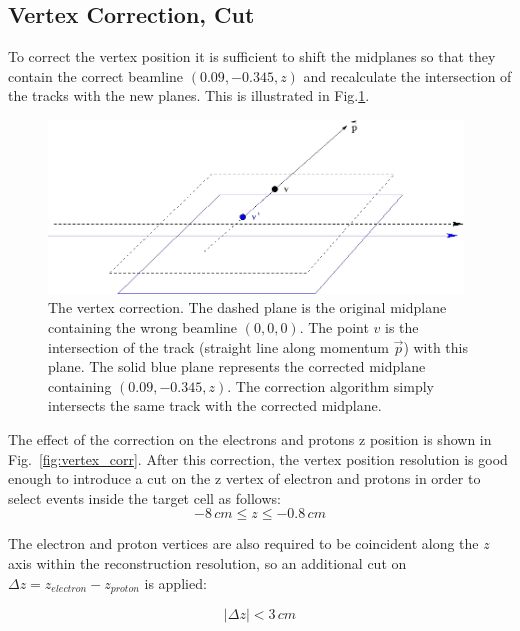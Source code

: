 \clearpage\newpage

\subsection{Vertex Correction, Cut}
To correct the vertex position it is sufficient to shift the midplanes
so that they contain the correct beamline $(0.09, -0.345, z)$ and recalculate 
the intersection of the tracks with the new planes.
This is illustrated in Fig.\ref{fig:vertex}.

\begin{figure}[h]
	\centering
		\includegraphics[width=0.98\textwidth ]{img/corr_vertex.jpg}
			\caption{The vertex correction. The dashed plane is the original midplane
						containing the wrong beamline $(0, 0, 0)$. The point $v$ is the 
						intersection of the track (straight line along momentum $\vec p$)
						with this plane. The solid blue plane represents the corrected
						midplane containing $(0.09, -0.345, z)$. The correction algorithm 
						simply intersects the same track with the corrected midplane. }
			\label{fig:vertex}
\end{figure}


\vspace{1cm}
The effect of the correction on the electrons and protons z position
is shown in Fig.~\ref{fig:vertex_corr}.
After this correction, the vertex position resolution is good enough to
introduce a cut on the z vertex of electron and protons in order to
select events inside the target cell as follows:
\begin{equation}
 -8\, cm \le z \le -0.8\, cm
\label{eqn:vertex_cut1} 
\end{equation}

The electron and proton vertices are also required to be coincident along the $z$ axis
within the reconstruction resolution, so an additional cut on
$\Delta z = z_{electron} - z_{proton}$ is applied:

\begin{equation}
 \left| \Delta z \right| < 3 \,cm
 \label{eqn:vertex_cut2} 
\end{equation}

